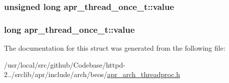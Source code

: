 \subsubsection[{\texorpdfstring{value}{value}}]{\setlength{\rightskip}{0pt plus 5cm}unsigned long apr\+\_\+thread\+\_\+once\+\_\+t\+::value}\hypertarget{structapr__thread__once__t_a2e82419ef57c194d5755d931613a84f5}{}\label{structapr__thread__once__t_a2e82419ef57c194d5755d931613a84f5}
\subsubsection[{\texorpdfstring{value}{value}}]{\setlength{\rightskip}{0pt plus 5cm}long apr\+\_\+thread\+\_\+once\+\_\+t\+::value}\hypertarget{structapr__thread__once__t_a8f46eac53eac5140df3a44962507da69}{}\label{structapr__thread__once__t_a8f46eac53eac5140df3a44962507da69}


The documentation for this struct was generated from the following file\+:\begin{DoxyCompactItemize}
\item 
/usr/local/src/github/\+Codebase/httpd-\/2../srclib/apr/include/arch/beos/\hyperlink{beos_2apr__arch__threadproc_8h}{apr\+\_\+arch\+\_\+threadproc.\+h}\end{DoxyCompactItemize}
